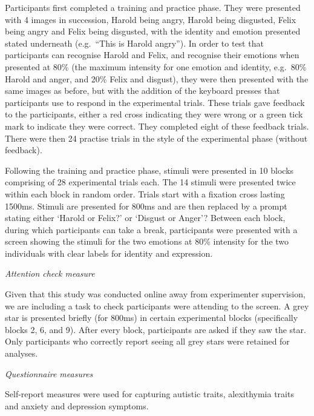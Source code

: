 \documentclass[
]{article}
\begin{document}
Participants first completed a training and practice phase. They were presented with 4 images in succession, Harold being angry, Harold being disgusted, Felix being angry and Felix being disgusted, with the identity and emotion presented stated underneath (e.g.~``This is Harold angry''). In order to test that participants can recognise Harold and Felix, and recognise their emotions when presented at 80\% (the maximum intensity for one emotion and identity, e.g.~80\% Harold and anger, and 20\% Felix and disgust), they were then presented with the same images as before, but with the addition of the keyboard presses that participants use to respond in the experimental trials. These trials gave feedback to the participants, either a red cross indicating they were wrong or a green tick mark to indicate they were correct. They completed eight of these feedback trials. There were then 24 practise trials in the style of the experimental phase (without feedback).

Following the training and practice phase, stimuli were presented in 10 blocks comprising of 28 experimental trials each. The 14 stimuli were presented twice within each block in random order. Trials start with a fixation cross lasting 1500ms. Stimuli are presented for 800ms and are then replaced by a prompt stating either `Harold or Felix?' or `Disgust or Anger'? Between each block, during which participants can take a break, participants were presented with a screen showing the stimuli for the two emotions at 80\% intensity for the two individuals with clear labels for identity and expression.

\emph{Attention check measure}

Given that this study was conducted online away from experimenter supervision, we are including a task to check participants were attending to the screen. A grey star is presented briefly (for 800ms) in certain experimental blocks (specifically blocks 2, 6, and 9). After every block, participants are asked if they saw the star. Only participants who correctly report seeing all grey stars were retained for analyses.

\emph{Questionnaire measures}

Self-report measures were used for capturing autistic traits, alexithymia traits and anxiety and depression symptoms.
\end{document}
